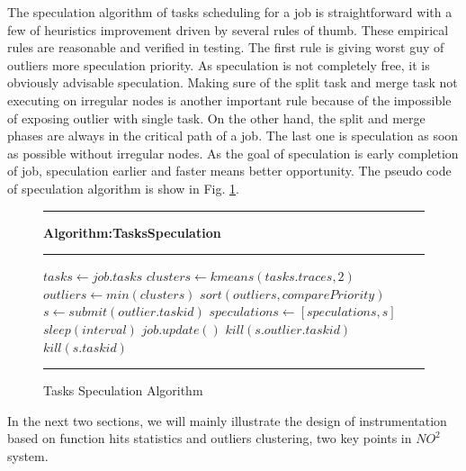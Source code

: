 The speculation algorithm of tasks scheduling for a job is straightforward with a few of heuristics improvement driven by several rules of thumb. These empirical rules are reasonable and verified in testing. The first rule is giving worst guy of outliers more speculation priority. As speculation is not completely free, it is obviously advisable speculation. Making sure of the split task and merge task not executing on irregular nodes is another important rule because of the impossible of exposing outlier with single task. On the other hand, the split and merge phases are always in the critical path of a job. The last one is speculation as soon as possible without irregular nodes. As the goal of speculation is early completion of job, speculation earlier and faster means better opportunity. The pseudo code of speculation algorithm is show in Fig. \ref{fig-spec-algo}.

\begin{figure}
\rule[-.2pt]{0.9\columnwidth}{0.9pt}
\textbf{Algorithm:TasksSpeculation}
\rule[-.2pt]{0.9\columnwidth}{0.5pt}

\begin{algorithmic}[1]




    \State $tasks\gets job.tasks$
    \State $clusters\gets kmeans(tasks.traces, 2)$
        \State $outliers\gets min(clusters)$
        \State $sort(outliers, comparePriority)$
            \State $s\gets submit(outlier.taskid)$
            \State $speculations\gets [speculations, s]$
        \EndFor
    \EndIf
    \State $sleep(interval)$
    \State $job.update()$
            \State $kill(s.outlier.taskid)$
            \State $kill(s.taskid)$
        \EndIf
    \EndFor
\EndWhile\label{specendwhile}
\end{algorithmic}
\rule[-.2pt]{0.9\columnwidth}{0.8pt}
\caption{Tasks Speculation Algorithm}\label{fig-spec-algo}
\end{figure}

In the next two sections, we will mainly illustrate the design of instrumentation based on function hits statistics and outliers clustering, two key points in $NO^2$ system. 
